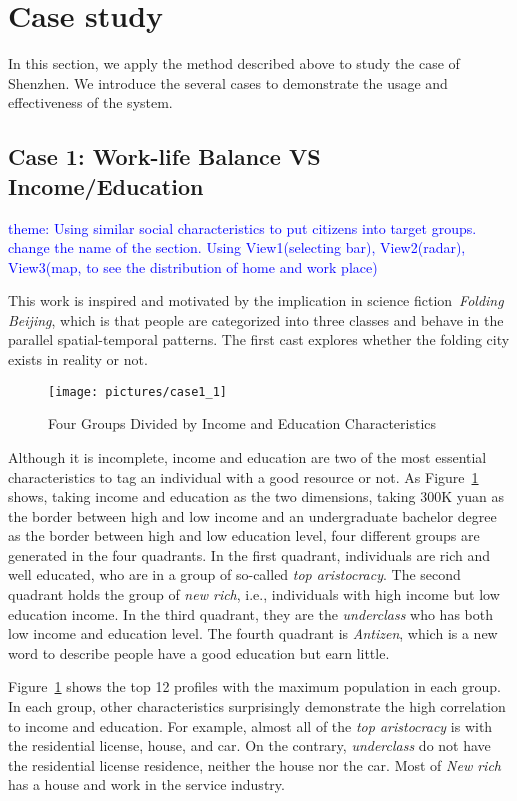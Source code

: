 \section{Case study}

In this section, we apply the method described above to study the case of Shenzhen. We introduce the several cases to demonstrate the usage and effectiveness of the system.

\subsection{Case 1: Work-life Balance VS Income/Education}
\textcolor{blue}{theme: Using similar social characteristics to put citizens into target groups. change the name of the section. Using View1(selecting bar), View2(radar), View3(map, to see the distribution of home and work place)}

This work is inspired and motivated by the implication in science fiction~\textit{Folding Beijing}, which is that people are categorized into three classes and behave in the parallel spatial-temporal patterns. The first cast explores whether the folding city exists in reality or not.

\begin{figure}[htb!]
 \centering
 \texttt{[image: pictures/case1\_1]}
 \caption{Four Groups Divided by Income and Education Characteristics}
 \label{case11}
\end{figure}

Although it is incomplete, income and education are two of the most essential characteristics to tag an individual with a good resource or not.
As Figure~\ref{case11} shows, taking income and education as the two dimensions, taking 300K yuan as the border between high and low income and an undergraduate bachelor degree as the border between high and low education level, four different groups are generated in the four quadrants. In the first quadrant, individuals are rich and well educated, who are in a group of so-called \textit{top aristocracy}. The second quadrant holds the group of \textit{new rich}, i.e., individuals with high income but low education income. In the third quadrant, they are the \textit{underclass} who has both low income and education level. The fourth quadrant is \textit{Antizen}, which is a new word to describe people have a good education but earn little.


Figure~\ref{case11} shows the top 12 profiles with the maximum population in each group. In each group, other characteristics surprisingly demonstrate the high correlation to income and education. For example, almost all of the \textit{top aristocracy} is with the residential license,  house, and car. On the contrary, \textit{underclass} do not have the residential license residence, neither the house nor the car. Most of \textit{New rich} has a house and work in the service industry.

